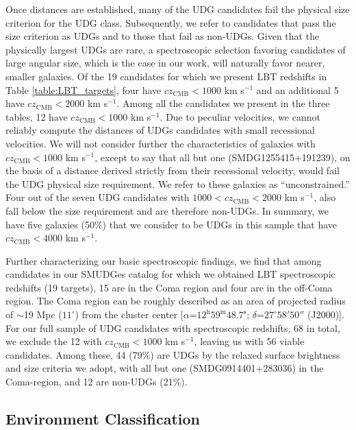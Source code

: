 \documentclass[twocolumn,tighten]{aastex63}
\newcommand{\ra}[3]{$#1^\mathrm{h} #2^\mathrm{m} #3^\mathrm{s}$}
\newcommand{\dec}[3]{$#1^\circ #2' #3''$}
\begin{document}
Once distances are established, many of the UDG candidates fail the physical size criterion for the UDG class. Subsequently, we refer to candidates that pass the size criterion as UDGs and to those that fail as non-UDGs. Given that the physically largest UDGs are rare, a spectroscopic selection favoring candidates of large angular size, which is the case in our work, will naturally favor nearer, smaller galaxies. Of the 19 candidates for which we present LBT redshifts in Table \ref{table:LBT_targets}, four have $cz_\text{CMB} < 1000$ km s$^{-1}$ and an additional 5 have $cz_\text{CMB} < 2000$ km s$^{-1}$. Among all the candidates we present in the three tables, 12 have $cz_\text{CMB} < 1000$ km s$^{-1}$. Due to peculiar velocities, we cannot reliably compute the distances of UDGs candidates with small recessional velocities.
We will not consider further the characteristics of galaxies with $cz_\text{CMB} < 1000$ km s$^{-1}$, except to say that all but one (SMDG1255415+191239), on the basis of a distance derived strictly from their recessional velocity, would fail the UDG physical size requirement. We refer to these galaxies as ``unconstrained.'' 
Four out of the seven UDG candidates with $1000 < cz_\text{CMB} < 2000$ km s$^{-1}$, also fall below the size requirement and are therefore non-UDGs. In summary, we have five galaxies (50\%) that we consider to be UDGs in this sample that have $cz_\text{CMB} < 4000$ km s$^{-1}$. 

Further characterizing our basic spectroscopic findings, we find that among candidates in our SMUDGes catalog for which we obtained LBT spectroscopic redshifts (19 targets), 15 are in the Coma region and four are in the off-Coma region. The Coma region can be roughly described as an area of projected radius of 
$\sim$19 Mpc ($11^\circ$) from the cluster center [$\alpha$=\ra{12}{59}{48.7}; $\delta$=\dec{27}{58}{50} (J2000)].
For our full sample of UDG candidates with spectroscopic redshifts, 68 in total, we exclude the 12 with $cz_\text{CMB} < 1000$ km s$^{-1}$, leaving us with 56 viable candidates. Among these, 44 (79\%) are UDGs by the relaxed surface brightness and size criteria we adopt, with all but one (SMDG0914401+283036) in the Coma-region, and 12 are non-UDGs (21\%).


\subsection{Environment Classification}
\label{environment_class}
\end{document}
